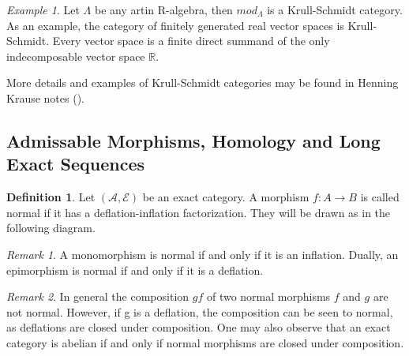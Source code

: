 \documentclass[11pt]{article}
\theoremstyle{definition}
\newtheorem{definition}{Definition}[section]
\theoremstyle{remark}
\newtheorem*{remark}{Remark}
\newtheorem*{example}{Example}
\begin{document}

            \begin{example}
                Let $\Lambda$ be any artin R-algebra, then $mod_{\Lambda}$ is a Krull-Schmidt category. As an example, the category of finitely generated real vector spaces is Krull-Schmidt. Every vector space is a finite direct summand of the only indecomposable vector space $\mathbb{R}$.
            \end{example}

            More details and examples of Krull-Schmidt categories may be found in Henning Krause notes (\cite{Kra12}).

        \subsection{Admissable Morphisms, Homology and Long Exact Sequences}
            
            \begin{definition}
                Let $(\mathcal{A},\mathcal{E})$ be an exact category. A morphism $f:A\rightarrow B$ is called normal if it has a deflation-inflation factorization. They will be drawn as in the following diagram.
                \begin{center}
                \end{center}
            \end{definition}

            \begin{remark}
                A monomorphism is normal if and only if it is an inflation. Dually, an epimorphism is normal if and only if it is a deflation.
            \end{remark}

            \begin{remark}
                In general the composition $gf$ of two normal morphisms $f$ and $g$ are not normal. However, if g is a deflation, the composition can be seen to normal, as deflations are closed under composition. One may also observe that an exact category is abelian if and only if normal morphisms are closed under composition.
            \end{remark}
\end{document}
